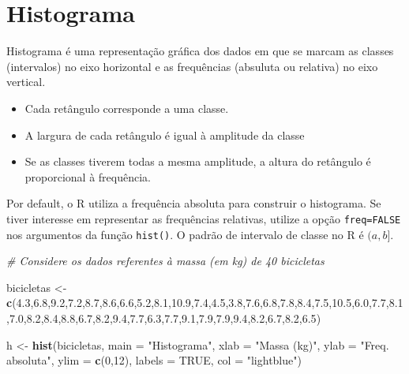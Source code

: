 \documentclass[
]{book}
\newenvironment{Shaded}{\begin{snugshade}}{\end{snugshade}}
\newcommand{\AttributeTok}[1]{\textcolor[rgb]{0.13,0.29,0.53}{#1}}
\newcommand{\CommentTok}[1]{\textcolor[rgb]{0.56,0.35,0.01}{\textit{#1}}}
\newcommand{\ConstantTok}[1]{\textcolor[rgb]{0.56,0.35,0.01}{#1}}
\newcommand{\DecValTok}[1]{\textcolor[rgb]{0.00,0.00,0.81}{#1}}
\newcommand{\FloatTok}[1]{\textcolor[rgb]{0.00,0.00,0.81}{#1}}
\newcommand{\FunctionTok}[1]{\textcolor[rgb]{0.13,0.29,0.53}{\textbf{#1}}}
\newcommand{\NormalTok}[1]{#1}
\newcommand{\OtherTok}[1]{\textcolor[rgb]{0.56,0.35,0.01}{#1}}
\newcommand{\StringTok}[1]{\textcolor[rgb]{0.31,0.60,0.02}{#1}}
\begin{document}
\section{Histograma}\label{histograma}

Histograma é uma representação gráfica dos dados em que se marcam as classes (intervalos) no eixo horizontal e as frequências (absuluta ou relativa) no eixo vertical.

\begin{itemize}
\item
  Cada retângulo corresponde a uma classe.
\item
  A largura de cada retângulo é igual à amplitude da classe
\item
  Se as classes tiverem todas a mesma amplitude, a altura do retângulo é proporcional à frequência.
\end{itemize}

Por default, o R utiliza a frequência absoluta para construir o histograma. Se tiver interesse em representar as frequências relativas, utilize a opção \texttt{freq=FALSE} nos argumentos da função \texttt{hist()}. O padrão de intervalo de classe no R é \((a, b]\).

\begin{Shaded}
\begin{Highlighting}[]
\CommentTok{\# Considere os dados referentes à massa (em kg) de 40 bicicletas}

\NormalTok{bicicletas }\OtherTok{\textless{}{-}} \FunctionTok{c}\NormalTok{(}\FloatTok{4.3}\NormalTok{,}\FloatTok{6.8}\NormalTok{,}\FloatTok{9.2}\NormalTok{,}\FloatTok{7.2}\NormalTok{,}\FloatTok{8.7}\NormalTok{,}\FloatTok{8.6}\NormalTok{,}\FloatTok{6.6}\NormalTok{,}\FloatTok{5.2}\NormalTok{,}\FloatTok{8.1}\NormalTok{,}\FloatTok{10.9}\NormalTok{,}\FloatTok{7.4}\NormalTok{,}\FloatTok{4.5}\NormalTok{,}\FloatTok{3.8}\NormalTok{,}\FloatTok{7.6}\NormalTok{,}\FloatTok{6.8}\NormalTok{,}\FloatTok{7.8}\NormalTok{,}\FloatTok{8.4}\NormalTok{,}\FloatTok{7.5}\NormalTok{,}\FloatTok{10.5}\NormalTok{,}\FloatTok{6.0}\NormalTok{,}\FloatTok{7.7}\NormalTok{,}\FloatTok{8.1}\NormalTok{,}\FloatTok{7.0}\NormalTok{,}\FloatTok{8.2}\NormalTok{,}\FloatTok{8.4}\NormalTok{,}\FloatTok{8.8}\NormalTok{,}\FloatTok{6.7}\NormalTok{,}\FloatTok{8.2}\NormalTok{,}\FloatTok{9.4}\NormalTok{,}\FloatTok{7.7}\NormalTok{,}\FloatTok{6.3}\NormalTok{,}\FloatTok{7.7}\NormalTok{,}\FloatTok{9.1}\NormalTok{,}\FloatTok{7.9}\NormalTok{,}\FloatTok{7.9}\NormalTok{,}\FloatTok{9.4}\NormalTok{,}\FloatTok{8.2}\NormalTok{,}\FloatTok{6.7}\NormalTok{,}\FloatTok{8.2}\NormalTok{,}\FloatTok{6.5}\NormalTok{)}
  
\NormalTok{h }\OtherTok{\textless{}{-}} \FunctionTok{hist}\NormalTok{(bicicletas,     }
  \AttributeTok{main =} \StringTok{"Histograma"}\NormalTok{,     }
  \AttributeTok{xlab =} \StringTok{"Massa (kg)"}\NormalTok{,     }
  \AttributeTok{ylab =} \StringTok{"Freq. absoluta"}\NormalTok{,     }
  \AttributeTok{ylim =} \FunctionTok{c}\NormalTok{(}\DecValTok{0}\NormalTok{,}\DecValTok{12}\NormalTok{),     }
  \AttributeTok{labels =} \ConstantTok{TRUE}\NormalTok{,     }
  \AttributeTok{col =} \StringTok{"lightblue"}\NormalTok{)}
\end{Highlighting}
\end{Shaded}
\end{document}
